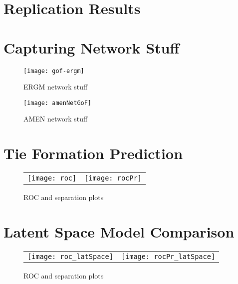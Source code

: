 

\section{Replication Results}



\section{Capturing Network Stuff}

\begin{figure}[ht]
	\centering
	\texttt{[image: gof-ergm]}
	\caption{ERGM network stuff}
	\label{fig:ergmNetGoF}
\end{figure}

\begin{figure}[ht]
	\centering
	\texttt{[image: amenNetGoF]}
	\caption{AMEN network stuff}
	\label{fig:amenNetGoF}
\end{figure}

\section{Tie Formation Prediction}



\begin{figure}[ht]
	\centering
	\begin{tabular}{cc}
	\texttt{[image: roc]} & 
	\texttt{[image: rocPr]}	
	\end{tabular}
	\caption{ROC and separation plots}
	\label{fig:roc}
\end{figure}


\section{Latent Space Model Comparison}



\begin{figure}[ht]
	\centering
	\begin{tabular}{cc}
	\texttt{[image: roc\_latSpace]} & 
	\texttt{[image: rocPr\_latSpace]}
	\end{tabular}
	\caption{ROC and separation plots}
	\label{fig:roc_latentSpace}
\end{figure}

